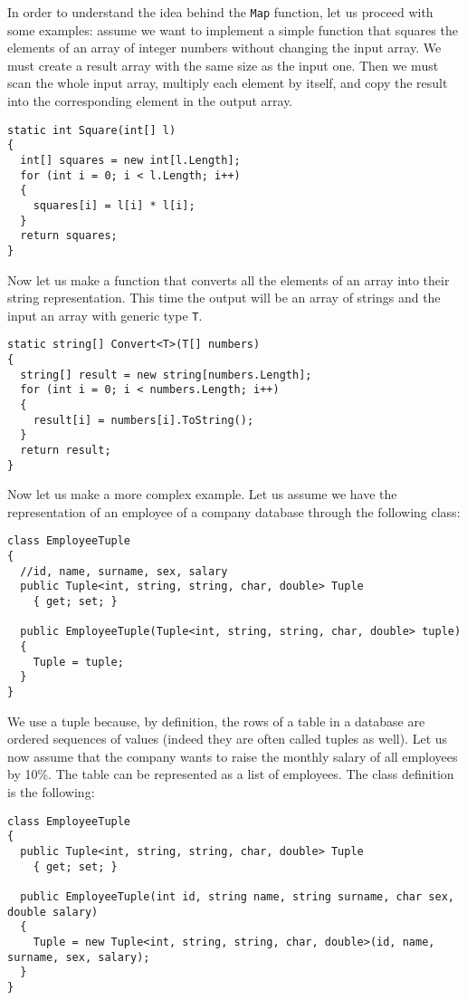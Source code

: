In order to understand the idea behind the \texttt{Map} function, let us proceed with some examples: assume we want to implement a simple function that squares the elements of an array of integer numbers without changing the input array. We must create a result array with the same size as the input one. Then we must scan the whole input array, multiply each element by itself, and copy the result into the corresponding element in the output array.

\begin{lstlisting}
static int Square(int[] l)
{
  int[] squares = new int[l.Length];
  for (int i = 0; i < l.Length; i++)
  {
    squares[i] = l[i] * l[i];
  }
  return squares;
}
\end{lstlisting}

Now let us make a function that converts all the elements of an array into their string representation. This time the output will be an array of strings and the input an array with generic type \texttt{T}.

\begin{lstlisting}
static string[] Convert<T>(T[] numbers)
{
  string[] result = new string[numbers.Length];
  for (int i = 0; i < numbers.Length; i++)
  {
    result[i] = numbers[i].ToString();
  }
  return result;
}
\end{lstlisting}

Now let us make a more complex example. Let us assume we have the representation of an employee of a company database through the following class:

\begin{lstlisting}
class EmployeeTuple
{
  //id, name, surname, sex, salary
  public Tuple<int, string, string, char, double> Tuple 
    { get; set; }

  public EmployeeTuple(Tuple<int, string, string, char, double> tuple)
  {
    Tuple = tuple;
  }
}
\end{lstlisting}

We use a tuple because, by definition, the rows of a table in a database are ordered sequences of values (indeed they are often called tuples as well). Let us now assume that the company wants to raise the monthly salary of all employees by 10\%. The table can be represented as a list of employees. The class definition is the following:

\begin{lstlisting}
class EmployeeTuple
{
  public Tuple<int, string, string, char, double> Tuple 
    { get; set; }

  public EmployeeTuple(int id, string name, string surname, char sex, double salary)
  {
    Tuple = new Tuple<int, string, string, char, double>(id, name, surname, sex, salary);
  }
}
\end{lstlisting}

